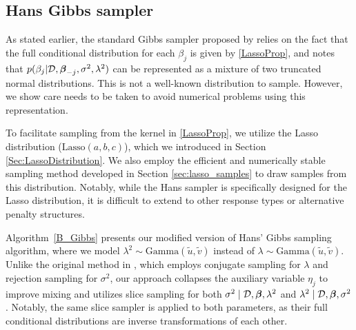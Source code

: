 \subsection{Hans Gibbs sampler}

As stated earlier, the standard Gibbs sampler proposed by \citet{hans2009bayesian} relies on the fact that the full conditional distribution for each $\beta_j$ is given by \eqref{LassoProp}, and \citet{hans2009bayesian} 
notes that $p(\beta_j|{\mathcal D},{\boldsymbol \beta}_{-j},\sigma^2,\lambda^2)$ can be represented as a mixture of two truncated normal distributions. This is not a well-known distribution to sample. However, we show care needs to be taken to avoid numerical problems using this representation.

To facilitate sampling from the kernel in \eqref{LassoProp}, we utilize the Lasso distribution ($\mbox{Lasso}(a,b,c)$), which we introduced in Section \ref{Sec:LassoDistribution}. We also employ the efficient and numerically stable sampling method developed in Section \ref{sec:lasso_samples} to draw samples from this distribution. Notably, while the Hans sampler is specifically designed for the Lasso distribution, it is difficult to extend to other response types or alternative penalty structures.


Algorithm~\ref{B_Gibbs} presents our modified version of Hans’ Gibbs sampling algorithm, where we model $\lambda^2 \sim \mbox{Gamma}(\widetilde{u},\widetilde{v})$ instead of $\lambda \sim \mbox{Gamma}(\widetilde{u},\widetilde{v})$. Unlike the original method in \citet{hans2009bayesian}, which employs conjugate sampling for $\lambda$ and rejection sampling for $\sigma^2$, our approach collapses the auxiliary variable $\eta_j$ to improve mixing and utilizes slice sampling for both $\sigma^2 \mid {\mathcal D}, {\boldsymbol \beta}, \lambda^2$ and $\lambda^2 \mid {\mathcal D}, {\boldsymbol \beta}, \sigma^2$ \citep{neal2003slice}. Notably, the same slice sampler is applied to both parameters, as their full conditional distributions are inverse transformations of each other. 





